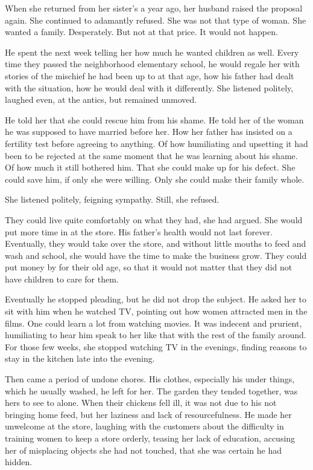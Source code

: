 \documentclass{article}
\begin{document}
When she returned from her sister's a year ago, her husband raised the proposal again. She continued to adamantly refused. She was not that type of woman. She wanted a family. Desperately. But not at that price. It would not happen.

He spent the next week telling her how much he wanted children as well. Every time they passed the neighborhood elementary school, he would regale her with stories of the mischief he had been up to at that age, how his father had dealt with the situation, how he would deal with it differently. She listened politely, laughed even, at the antics, but remained unmoved. 

He told her that she could rescue him from his shame. He told her of the woman he was supposed to have married before her. How her father has insisted on a fertility test before agreeing to anything. Of how humiliating and upsetting it had been to be rejected at the same moment that he was learning about his shame. Of how much it still bothered him. That she could make up for his defect. She could save him, if only she were willing. Only she could make their family whole. 

She listened politely, feigning sympathy. Still, she refused. 

They could live quite comfortably on what they had, she had argued. She would put more time in at the store. His father's health would not last forever. Eventually, they would take over the store, and without little mouths to feed and wash and school, she would have the time to make the business grow. They could put money by for their old age, so that it would not matter that they did not have children to care for them.

Eventually he stopped pleading, but he did not drop the subject. He asked her to sit with him when he watched TV, pointing out how women attracted men in the films. One could learn a lot from watching movies. It was indecent and prurient, humiliating to hear him speak to her like that with the rest of the family around. For those few weeks, she stopped watching TV in the evenings, finding reasons to stay in the kitchen late into the evening.

Then came a period of undone chores. His clothes, especially his under things, which he usually washed, he left for her. The garden they tended together, was hers to see to alone. When their chickens fell ill, it was not due to his not bringing home feed, but her laziness and lack of resourcefulness. He made her unwelcome at the store, laughing with the customers about the difficulty in training women to keep a store orderly, teasing her lack of education, accusing her of misplacing objects she had not touched, that she was certain he had hidden. 
\end{document}

